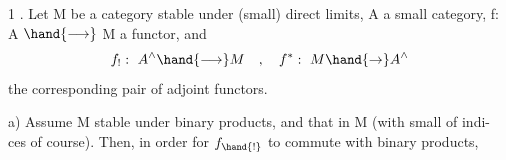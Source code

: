 \hand{\uline{\textcolor{black}{Proposition}}} 1 .  Let M be a category stable under (small) direct limits,
A a small category,  f: A $\hand{\longrightarrow}$ M a functor,  and
\[ f_! :\ A^{\wedge} \hand{\longrightarrow} M \quad , \quad f^* :\ M \hand{\to} A^{\wedge} \]
the corresponding pair of adjoint functors.

a)  Assume M stable under binary products,  and that  in M\hand{,}
 (with small  of indi-%
ces of course).  Then,  in order for $f_{\hand{!}}$ to commute with binary products,

